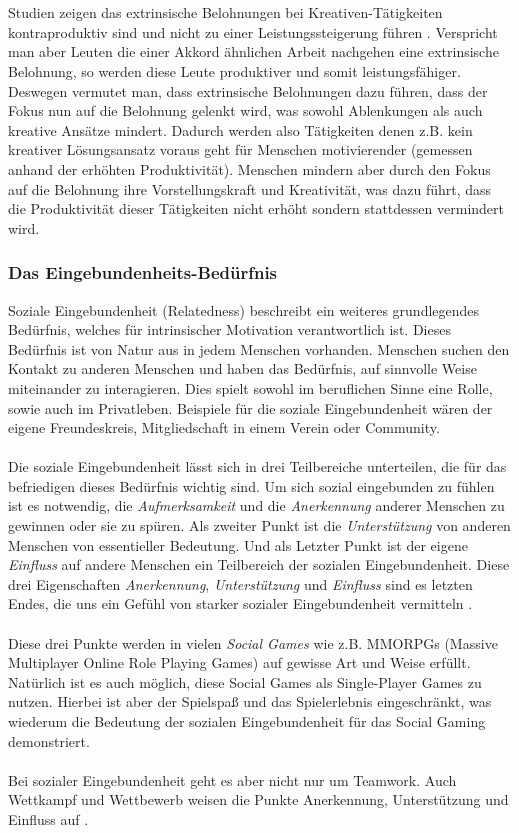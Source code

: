 \documentclass[a4paper,12pt]{scrartcl}
\begin{document}
\\\\
Studien zeigen das extrinsische Belohnungen bei Kreativen-Tätigkeiten kontraproduktiv sind und nicht zu einer Leistungssteigerung führen \cite{Pink2010}. Verspricht man aber Leuten die einer Akkord ähnlichen Arbeit nachgehen eine extrinsische Belohnung, so werden diese Leute produktiver und somit leistungsfähiger. Deswegen vermutet man, dass extrinsische Belohnungen dazu führen, dass der Fokus nun auf die Belohnung gelenkt wird, was sowohl Ablenkungen als auch kreative Ansätze mindert. Dadurch werden also Tätigkeiten denen z.B. kein kreativer Lösungsansatz voraus geht für Menschen motivierender (gemessen anhand der erhöhten Produktivität). Menschen mindern aber durch den Fokus auf die Belohnung ihre Vorstellungskraft und Kreativität, was dazu führt, dass die Produktivität dieser Tätigkeiten nicht erhöht sondern stattdessen vermindert wird.

\subsubsection{Das Eingebundenheits-Bedürfnis}
Soziale Eingebundenheit (Relatedness) beschreibt ein weiteres grundlegendes Bedürfnis, welches für intrinsischer Motivation verantwortlich ist. Dieses Bedürfnis ist von Natur aus in jedem Menschen vorhanden. Menschen suchen den Kontakt zu anderen Menschen und haben das Bedürfnis, auf sinnvolle Weise miteinander zu interagieren. Dies spielt sowohl im beruflichen Sinne eine Rolle, sowie auch im Privatleben. Beispiele für die soziale Eingebundenheit wären der eigene Freundeskreis, Mitgliedschaft in einem Verein oder Community. 
\\\\
Die soziale Eingebundenheit lässt sich in drei Teilbereiche unterteilen, die für das befriedigen dieses Bedürfnis wichtig sind. Um sich sozial eingebunden zu fühlen ist es notwendig, die \textit{Aufmerksamkeit} und die \textit{Anerkennung} anderer Menschen zu gewinnen oder sie zu spüren. Als zweiter Punkt ist die \textit{Unterstützung} von anderen Menschen von essentieller Bedeutung. Und als Letzter Punkt ist der eigene \textit{Einfluss} auf andere Menschen ein Teilbereich der sozialen Eingebundenheit. Diese drei Eigenschaften \textit{Anerkennung}, \textit{Unterstützung} und \textit{Einfluss} sind es letzten Endes, die uns ein Gefühl von starker sozialer Eingebundenheit vermitteln \cite{Rigby2011}.
\\\\
Diese drei Punkte werden in vielen \textit{Social Games} wie z.B. MMORPGs (Massive Multiplayer Online Role Playing Games) auf gewisse Art und Weise erfüllt. Natürlich ist es auch möglich, diese Social Games als Single-Player Games zu nutzen. Hierbei ist aber der Spielspaß und das Spielerlebnis eingeschränkt, was wiederum die Bedeutung der sozialen Eingebundenheit für das Social Gaming demonstriert.
\\\\
Bei sozialer Eingebundenheit geht es aber nicht nur um Teamwork. Auch Wettkampf und Wettbewerb weisen die Punkte Anerkennung, Unterstützung und Einfluss auf \cite{Rigby2011}.
\end{document}
